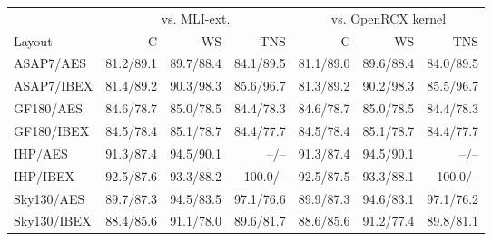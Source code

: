 \begin{tabular*}{\columnwidth}{@{\extracolsep{\fill}}lrrrrrr@{}}
\toprule
& \multicolumn{3}{c}{vs. MLI-ext.} & \multicolumn{3}{c}{vs. OpenRCX kernel} \\
\cmidrule(lr){2-4}\cmidrule(l){5-7}
Layout & C & WS & TNS & C & WS & TNS \\
\midrule
ASAP7/AES & 81.2/89.1 & 89.7/88.4 & 84.1/89.5 & 81.1/89.0 & 89.6/88.4 & 84.0/89.5 \\
ASAP7/IBEX & 81.4/89.2 & 90.3/98.3 & 85.6/96.7 & 81.3/89.2 & 90.2/98.3 & 85.5/96.7 \\
GF180/AES & 84.6/78.7 & 85.0/78.5 & 84.4/78.3 & 84.6/78.7 & 85.0/78.5 & 84.4/78.3 \\
GF180/IBEX & 84.5/78.4 & 85.1/78.7 & 84.4/77.7 & 84.5/78.4 & 85.1/78.7 & 84.4/77.7 \\
IHP/AES & 91.3/87.4 & 94.5/90.1 & --/-- & 91.3/87.4 & 94.5/90.1 & --/-- \\
IHP/IBEX & 92.5/87.6 & 93.3/88.2 & 100.0/-- & 92.5/87.5 & 93.3/88.1 & 100.0/-- \\
Sky130/AES & 89.7/87.3 & 94.5/83.5 & 97.1/76.6 & 89.9/87.3 & 94.6/83.1 & 97.1/76.2 \\
Sky130/IBEX & 88.4/85.6 & 91.1/78.0 & 89.6/81.7 & 88.6/85.6 & 91.2/77.4 & 89.8/81.1 \\
\bottomrule
\end{tabular*}
